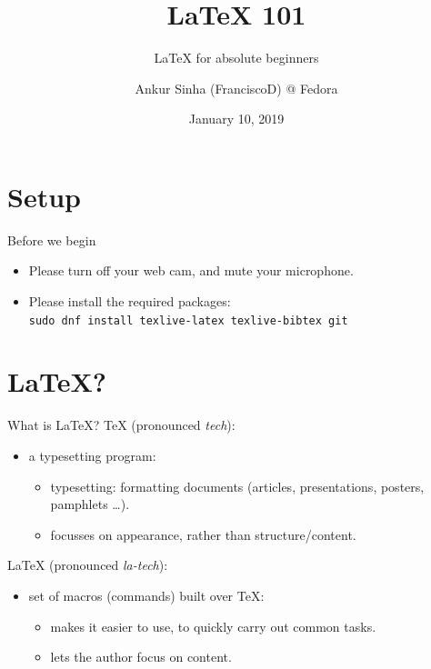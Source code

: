 \documentclass[usenames,dvipsnames]{beamer}
\title[\LaTeX{}]{\LaTeX{} 101}
\subtitle{\LaTeX{} for absolute beginners}
\author[ankursinha: FranciscoD]{Ankur Sinha (FranciscoD) @ Fedora}
\date{January 10, 2019}
\begin{document}
\begin{frame}
  \titlepage{}
\end{frame}

\section{Setup}
\begin{frame}[c]{Before we begin}
  \begin{itemize}
    \item Please turn off your web cam, and mute your microphone.
    \item Please install the required packages:\\ \texttt{sudo dnf install texlive-latex texlive-bibtex git}
  \end{itemize}
\end{frame}
\section{\LaTeX{}?}
\begin{frame}[c]{What is \LaTeX{}?}
  \TeX{} (pronounced \emph{tech})\footnotemark:
  \begin{itemize}
    \item a \alert{typesetting} program:
      \begin{itemize}
        \item typesetting: formatting documents (articles, presentations, posters, pamphlets \ldots).
        \item focusses on appearance, rather than structure/content.
      \end{itemize}
  \end{itemize}
  \pause{}
  \LaTeX{} (pronounced \emph{la-tech})\footnotemark:
  \begin{itemize}
    \item set of \alert{macros} (commands) built over \TeX{}:
      \begin{itemize}
        \item makes it easier to use, to quickly carry out common tasks.
        \item lets the author focus on content.
      \end{itemize}
  \end{itemize}
\end{frame}
\end{document}
